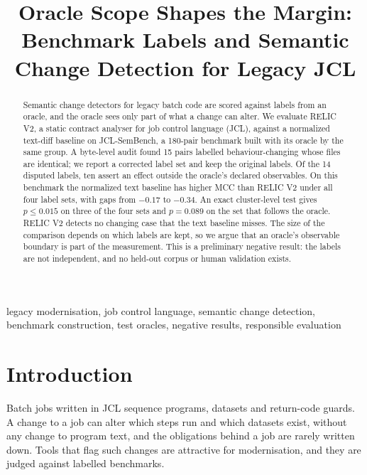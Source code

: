 \documentclass[conference]{IEEEtran}
\begin{document}
\title{Oracle Scope Shapes the Margin: Benchmark Labels and Semantic Change Detection for Legacy JCL}

\author{
}

\maketitle

\begin{abstract}
Semantic change detectors for legacy batch code are scored against labels from an oracle, and the oracle sees only part of what a change can alter. We evaluate RELIC V2, a static contract analyser for job control language (JCL), against a normalized text-diff baseline on JCL-SemBench, a 180-pair benchmark built with its oracle by the same group. A byte-level audit found 15 pairs labelled behaviour-changing whose files are identical; we report a corrected label set and keep the original labels. Of the 14 disputed labels, ten assert an effect outside the oracle's declared observables. On this benchmark the normalized text baseline has higher MCC than RELIC V2 under all four label sets, with gaps from $-0.17$ to $-0.34$. An exact cluster-level test gives $p\le0.015$ on three of the four sets and $p=0.089$ on the set that follows the oracle. RELIC V2 detects no changing case that the text baseline misses. The size of the comparison depends on which labels are kept, so we argue that an oracle's observable boundary is part of the measurement. This is a preliminary negative result: the labels are not independent, and no held-out corpus or human validation exists.
\end{abstract}

\begin{IEEEkeywords}
legacy modernisation, job control language, semantic change detection, benchmark construction, test oracles, negative results, responsible evaluation
\end{IEEEkeywords}

\section{Introduction}
Batch jobs written in JCL sequence programs, datasets and return-code guards. A change to a job can alter which steps run and which datasets exist, without any change to program text, and the obligations behind a job are rarely written down. Tools that flag such changes are attractive for modernisation, and they are judged against labelled benchmarks.
\end{document}
